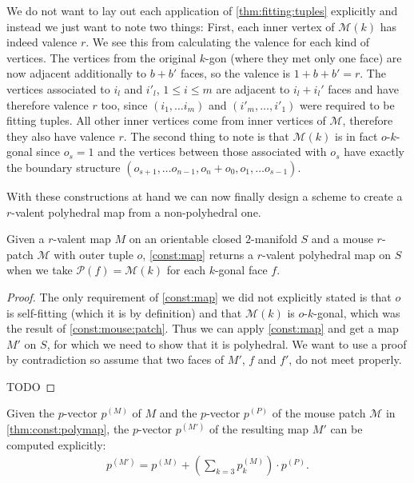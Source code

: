 \begin{construction}
We do not want to lay out each application of \autoref{thm:fitting:tuples} explicitly and instead we just want to note two things: First, each inner vertex of $\mathcal{M}(k)$ has indeed valence $r$. We see this from calculating the valence for each kind of vertices. The vertices from the original $k$-gon (where they met only one face) are now adjacent additionally to $b + b'$ faces, so the valence is $1 + b + b' = r$. The vertices associated to $i_l$ and $i'_l$, $1 \leq i \leq m$ are adjacent to $i_l + i_l'$ faces and have therefore valence $r$ too, since $(i_1, \dots i_m)$ and $(i'_m, \dots, i'_1)$ were required to be fitting tuples. All other inner vertices come from inner vertices of $\mathcal{M}$, therefore they also have valence $r$. The second thing to note is that $\mathcal{M}(k)$ is in fact $o$-$k$-gonal since $o_s = 1$ and the vertices between those associated with $o_s$ have exactly the boundary structure $(o_{s + 1}, \dots o_{n - 1}, o_n + o_0, o_1, \dots o_{s - 1})$.
\end{construction}

With these constructions at hand we can now finally design a scheme to create a $r$-valent polyhedral map from a non-polyhedral one.

\begin{theorem}\label{thm:const:polymap}
  Given a $r$-valent map $M$ on an orientable closed $2$-manifold $S$ and a mouse $r$-patch $\mathcal{M}$ with outer tuple $o$, \autoref{const:map} returns a $r$-valent polyhedral map on $S$ when we take $\mathcal{P}(f) = \mathcal{M}(k)$ for each $k$-gonal face $f$.
\begin{proof}
The only requirement of \autoref{const:map} we did not explicitly stated is that $o$ is self-fitting (which it is by definition) and that $\mathcal{M}(k)$ is $o$-$k$-gonal, which was the result of \autoref{const:mouse:patch}. Thus we can apply \autoref{const:map} and get a map $M'$ on $S$, for which we need to show that it is polyhedral. We want to use a proof by contradiction so assume that two faces of $M'$, $f$ and $f'$, do not meet properly.

TODO
\end{proof}
\end{theorem}

\begin{remark}
  Given the $p$-vector $p^{(M)}$ of $M$ and the $p$-vector $p^{(P)}$ of the mouse patch $\mathcal{M}$ in \autoref{thm:const:polymap}, the $p$-vector $p^{(M')}$ of the resulting map $M'$ can be computed explicitly:
  \begin{align*}
    p^{(M')} = p^{(M)} + \left(\sum_{k = 3} p^{(M)}_k\right) \cdot p^{(P)}.
  \end{align*}
\end{remark}